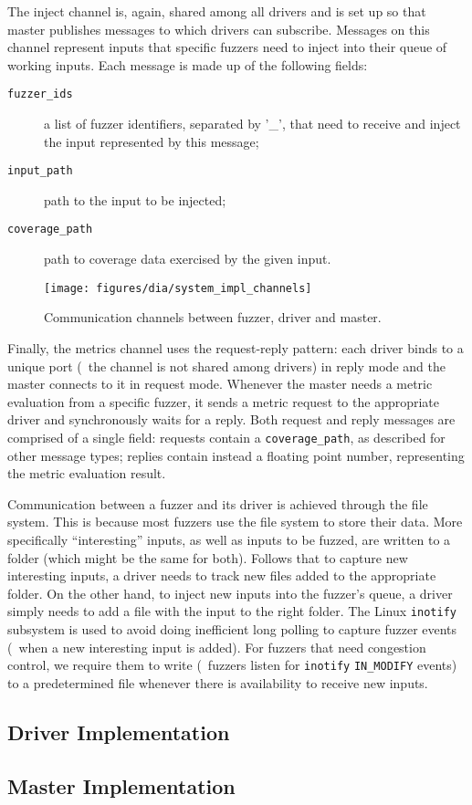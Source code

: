 The inject channel is, again, shared among all drivers and is set up so that
master publishes messages to which drivers can subscribe. Messages on this
channel represent inputs that specific fuzzers need to inject into their queue
of working inputs. Each message is made up of the following fields:

\begin{description}
    \item[\texttt{fuzzer\_ids}] a list of fuzzer identifiers, separated by '\_',
        that need to receive and inject the input represented by this message;
    \item[\texttt{input\_path}] path to the input to be injected;
    \item[\texttt{coverage\_path}] path to coverage data exercised by the given
        input.
\end{description}

\begin{figure}[t]
    \centering
    \texttt{[image: figures/dia/system\_impl\_channels]}
    \caption{Communication channels between fuzzer, driver and master.}
    \label{fig:system-impl}
\end{figure}

Finally, the metrics channel uses the request-reply pattern: each driver binds
to a unique port (\ie~the channel is not shared among drivers) in reply mode and
the master connects to it in request mode. Whenever the master needs a metric
evaluation from a specific fuzzer, it sends a metric request to the appropriate
driver and synchronously waits for a reply. Both request and reply messages are
comprised of a single field: requests contain a \texttt{coverage\_path}, as
described for other message types; replies contain instead a floating point
number, representing the metric evaluation result.

Communication between a fuzzer and its driver is achieved through the file
system. This is because most fuzzers use the file system to store their data.
More specifically ``interesting'' inputs, as well as inputs to be fuzzed, are
written to a folder (which might be the same for both). Follows that to capture
new interesting inputs, a driver needs to track new files added to the
appropriate folder. On the other hand, to inject new inputs into the fuzzer's
queue, a driver simply needs to add a file with the input to the right folder.
The Linux \texttt{inotify} subsystem is used to avoid doing inefficient long
polling to capture fuzzer events (\eg~when a new interesting input is added).
For fuzzers that need congestion control, we require them to write (\ie~fuzzers
listen for \texttt{inotify} \texttt{IN\_MODIFY} events) to a predetermined file
whenever there is availability to receive new inputs.

\subsection{Driver Implementation}
\label{sec:driver-impl}

\subsection{Master Implementation}
\label{sec:master-impl}

